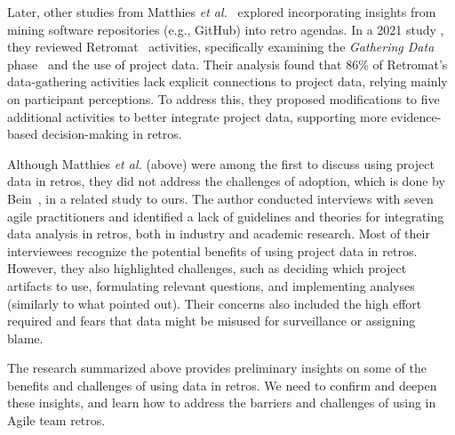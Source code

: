 Later, other studies from Matthies \textit{et al.}~\cite{matthies_feedback_2019, matthies_mining_2020, matthies_playing_2020} explored incorporating insights from mining software repositories (e.g., GitHub) into retro agendas. 
In a 2021 study \cite{matthies_experience_2021}, they reviewed Retromat~\cite{retromat} activities, specifically examining the \textit{Gathering Data} phase~\cite{derby_agile_2006} and the use of project data. Their analysis found that 86\% of Retromat's data-gathering activities lack explicit connections to project data, relying mainly on participant perceptions. 
To address this, they proposed modifications to five additional activities to better integrate project data, supporting more evidence-based decision-making in retros.

Although Matthies \textit{et al.} (above) were among the first to discuss using project data in retros, they did not address the challenges of adoption, which is done by Bein~\cite{bein_student_2023}, in a related study to ours. The author conducted interviews with seven agile practitioners and identified a lack of guidelines and theories for integrating data analysis in retros, both in industry and academic research.
Most of their interviewees recognize the potential benefits of using project data in retros. However, they also highlighted challenges, such as deciding which project artifacts to use, formulating relevant questions, and implementing analyses (similarly to what \cite{erdogan_more_2018} pointed out). Their concerns also included the high effort required and fears that data might be misused for surveillance or assigning blame.

The research summarized above provides preliminary insights on some of the benefits and challenges of using data in retros. We need to confirm and deepen these insights, and learn how to address the barriers and challenges of using  in Agile team retros. 


